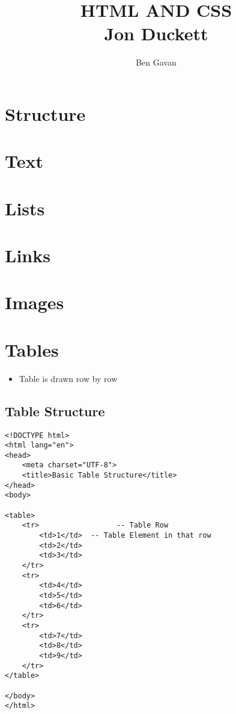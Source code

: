 \documentclass[]{article}
\title{HTML AND CSS \\ Jon Duckett}
\author{Ben Gavan}
\newcommand{\<}{\guilsinglleft}
\renewcommand{\>}{\guilsinglright}
\begin{document}
\maketitle

\begin{abstract}

\end{abstract}

\tableofcontents

\section{Structure}

\section{Text}

\section{Lists}

\section{Links}

\section{Images}

\section{Tables}

\begin{itemize}
	\item Table is drawn row by row
\end{itemize}

\subsection{Table Structure}
\begin{lstlisting}
<!DOCTYPE html>
<html lang="en">
<head>
	<meta charset="UTF-8">
	<title>Basic Table Structure</title>
</head>
<body>

<table>
	<tr>				  -- Table Row
		<td>1</td>	-- Table Element in that row
		<td>2</td>
		<td>3</td>
	</tr>
	<tr>
		<td>4</td>
		<td>5</td>
		<td>6</td>
	</tr>
	<tr>
		<td>7</td>
		<td>8</td>
		<td>9</td>
	</tr>
</table>

</body>
</html>
\end{lstlisting}
\end{document}
